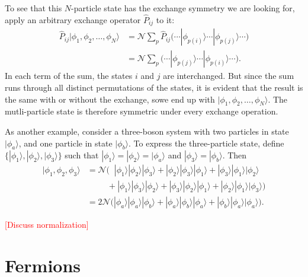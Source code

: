 \documentclass[pra,11pt]{revtex4}
\begin{document}
To see that this $N$-particle state has the exchange symmetry we are
looking for, apply an arbitrary exchange operator $\hat{P}_{ij}$ to it:
$$\begin{aligned}\hat{P}_{ij}|\phi_1,\phi_2,\dots,\phi_N\rangle &= \mathcal{N} \sum_p \hat{P}_{ij} \Big(\cdots  |\phi_{p(i)}\rangle  \cdots  |\phi_{p(j)}\rangle\cdots\Big) \\&= \mathcal{N} \sum_p \Big(\cdots  |\phi_{p(j)}\rangle  \cdots  |\phi_{p(i)}\rangle\cdots\Big).\end{aligned}$$
In each term of the sum, the states $i$ and $j$ are interchanged.  But
since the sum runs through all distinct permutations of the states, it
is evident that the result is the same with or without the exchange,
sowe end up with $|\phi_1,\phi_2,\dots,\phi_N\rangle$.  The
mutli-particle state is therefore symmetric under every exchange
operation.

As another example, consider a three-boson system with two particles
in state $|\phi_a\rangle$, and one particle in state $|\phi_b\rangle$.
To express the three-particle state, define $\{|\phi_1\rangle,
|\phi_2\rangle, |\phi_3\rangle\}$ such that $|\phi_1\rangle =
|\phi_2\rangle = |\phi_a\rangle$ and $|\phi_3\rangle =
|\phi_b\rangle$.  Then
$$\begin{aligned}|\phi_1,\phi_2,\phi_3\rangle &= \mathcal{N} \Big( \;\;
|\phi_1\rangle|\phi_2\rangle|\phi_3\rangle +
|\phi_2\rangle|\phi_3\rangle|\phi_1\rangle +
|\phi_3\rangle|\phi_1\rangle|\phi_2\rangle \\ &\qquad\;\, +
|\phi_1\rangle|\phi_3\rangle|\phi_2\rangle +
|\phi_3\rangle|\phi_2\rangle|\phi_1\rangle +
|\phi_2\rangle|\phi_1\rangle|\phi_3\rangle\Big) \\
&= 2\mathcal{N} \Big(
|\phi_a\rangle|\phi_a\rangle|\phi_b\rangle +
|\phi_a\rangle|\phi_b\rangle|\phi_a\rangle +
|\phi_b\rangle|\phi_a\rangle|\phi_a\rangle\Big).
\end{aligned}$$

\textcolor{red}{[Discuss normalization]}

\section{Fermions}
\end{document}
